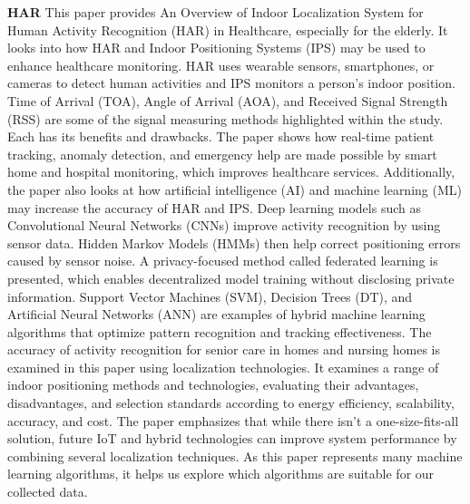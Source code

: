 \documentclass[conference]{IEEEtran}
\begin{document}
	\textbf{HAR}
	This paper provides An Overview of Indoor Localization System for Human Activity Recognition (HAR) in Healthcare, especially for the elderly. It looks into how HAR and Indoor Positioning Systems (IPS) may be used to enhance healthcare monitoring. HAR uses wearable sensors, smartphones, or cameras to detect human activities and IPS monitors a person's indoor position. Time of Arrival (TOA), Angle of Arrival (AOA), and Received Signal Strength (RSS) are some of the signal measuring methods highlighted within the study. Each has its benefits and drawbacks. The paper shows how real-time patient tracking, anomaly detection, and emergency help are made possible by smart home and hospital monitoring, which improves healthcare services. Additionally, the paper also looks at how artificial intelligence (AI) and machine learning (ML) may increase the accuracy of HAR and IPS. Deep learning models such as Convolutional Neural Networks (CNNs) improve activity recognition by using sensor data. Hidden Markov Models (HMMs) then help correct positioning errors caused by sensor noise. A privacy-focused method called federated learning is presented, which enables decentralized model training without disclosing private information. Support Vector Machines (SVM), Decision Trees (DT), and Artificial Neural Networks (ANN) are examples of hybrid machine learning algorithms that optimize pattern recognition and tracking effectiveness. The accuracy of activity recognition for senior care in homes and nursing homes is examined in this paper using localization technologies. It examines a range of indoor positioning methods and technologies, evaluating their advantages, disadvantages, and selection standards according to energy efficiency, scalability, accuracy, and cost. The paper emphasizes that while there isn't a one-size-fits-all solution, future IoT and hybrid technologies can improve system performance by combining several localization techniques. As this paper represents many machine learning algorithms, it helps us explore which algorithms are suitable for our collected data.
	
\end{document}
